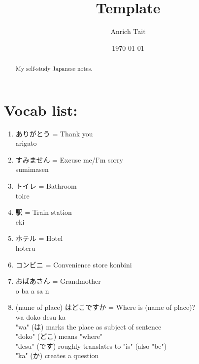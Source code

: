 \documentclass[12pt, letterpaper]{report}
\title{Template}
\author{Anrich Tait}
\date{\today}
\begin{document}
\restoregeometry %
\nopagecolor%

\tableofcontents
\begin{abstract}
My self-study Japanese notes.
\end{abstract}

\chapter{Vocab list:}
\begin{enumerate}
	\item ありがとう = Thank you\\
		arigato
	\item すみません = Excuse me/I'm sorry\\
		sumimasen
	\item トイレ = Bathroom\\
		toire
	\item 駅 = Train station\\
		eki
	\item ホテル = Hotel\\
		hoteru
	\item コンビニ = Convenience store
		konbini
	\item おばあさん = Grandmother\\
		o ba a sa n
	\item (name of place) はどこですか = Where is (name of place)?\\
		wa doko desu ka\\
		"wa" (は) marks the place as subject of sentence\\
		"doko" (どこ) means "where"\\
		"desu" (です) roughly translates to "is" (also "be")\\
		"ka" (か) creates a question\\
\end{enumerate}
\end{document}
